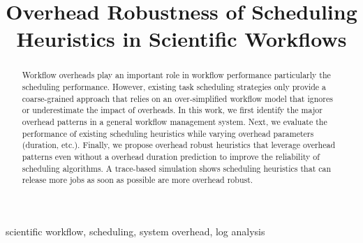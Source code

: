 \documentclass[final]{IEEEtran}
\begin{document}
\title{Overhead Robustness of Scheduling Heuristics in Scientific Workflows}

\author{
}
\maketitle


\begin{abstract}
Workflow overheads play an important role in workflow performance particularly the scheduling performance. However, existing task scheduling strategies only provide a coarse-grained approach that relies on an over-simplified workflow model that ignores or underestimate the impact of overheads. In this work, we first identify the major overhead patterns in a general workflow management system. Next, we evaluate the performance of existing scheduling heuristics while varying overhead parameters (duration, etc.). Finally, we propose overhead robust heuristics that leverage overhead patterns even without a overhead duration prediction to improve the reliability of scheduling algorithms. A trace-based simulation shows scheduling heuristics that can release more jobs as soon as possible are more overhead robust. 



\end{abstract}

\begin{IEEEkeywords}
scientific workflow, scheduling, system overhead, log analysis
\end{IEEEkeywords}

\IEEEpeerreviewmaketitle
\end{document}
